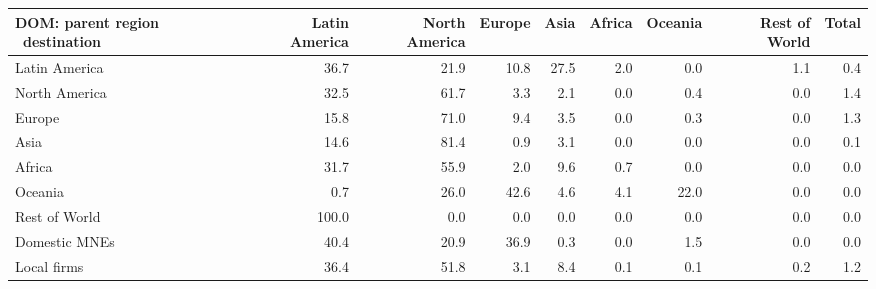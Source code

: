 \begin{tabular}{lrrrrrrrr}
\toprule
DOM: parent region \ destination & Latin America & North America & Europe & Asia & Africa & Oceania & Rest of World & Total \\
\midrule
Latin America & 36.7 & 21.9 & 10.8 & 27.5 & 2.0 & 0.0 & 1.1 & 0.4 \\
North America & 32.5 & 61.7 & 3.3 & 2.1 & 0.0 & 0.4 & 0.0 & 1.4 \\
Europe & 15.8 & 71.0 & 9.4 & 3.5 & 0.0 & 0.3 & 0.0 & 1.3 \\
Asia & 14.6 & 81.4 & 0.9 & 3.1 & 0.0 & 0.0 & 0.0 & 0.1 \\
Africa & 31.7 & 55.9 & 2.0 & 9.6 & 0.7 & 0.0 & 0.0 & 0.0 \\
Oceania & 0.7 & 26.0 & 42.6 & 4.6 & 4.1 & 22.0 & 0.0 & 0.0 \\
Rest of World & 100.0 & 0.0 & 0.0 & 0.0 & 0.0 & 0.0 & 0.0 & 0.0 \\
Domestic MNEs & 40.4 & 20.9 & 36.9 & 0.3 & 0.0 & 1.5 & 0.0 & 0.0 \\
Local firms & 36.4 & 51.8 & 3.1 & 8.4 & 0.1 & 0.1 & 0.2 & 1.2 \\
\bottomrule
\end{tabular}

